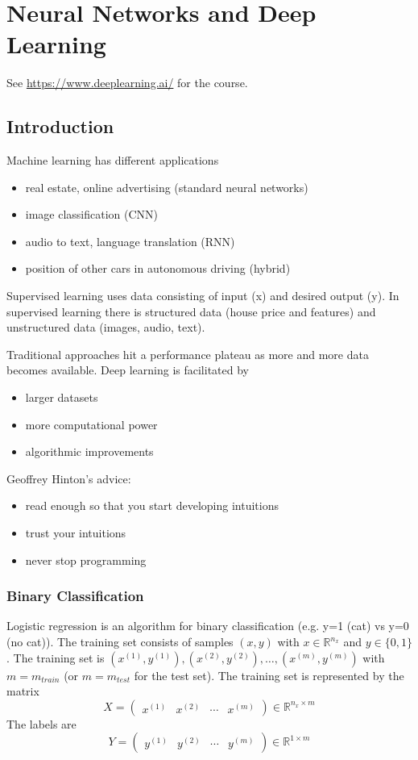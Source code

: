 \documentclass{article}
\begin{document}
\section{Neural Networks and Deep Learning}
See \url{https://www.deeplearning.ai/} for the course.
\subsection{Introduction}
Machine learning has different applications
\begin{itemize}
\item real estate, online advertising (standard neural networks)
\item image classification (CNN)
\item audio to text, language translation (RNN)
\item position of other cars in autonomous driving (hybrid)
\end{itemize}

Supervised learning uses data consisting of input (x) and desired output (y).
In supervised learning there is structured data (house price and features)
and unstructured data (images, audio, text).

Traditional approaches hit a performance plateau as more and more data becomes available.
Deep learning is facilitated by
\begin{itemize}
\item larger datasets
\item more computational power
\item algorithmic improvements
\end{itemize}

Geoffrey Hinton's advice:
\begin{itemize}
\item read enough so that you start developing intuitions
\item trust your intuitions
\item never stop programming
\end{itemize}

\subsubsection{Binary Classification}
Logistic regression is an algorithm for binary classification (e.g. y=1 (cat) vs y=0 (no cat)).
The training set consists of samples $(x,y)$ with $x\in\mathbb{R}^{n_x}$ and $y\in\{0,1\}$.
The training set is $(x^{(1)},y^{(1)}), (x^{(2)},y^{(2)}), \ldots, (x^{(m)},y^{(m)})$ with $m=m_{train}$ (or $m=m_{test}$ for the test set).
The training set is represented by the matrix
\begin{equation}
  X=\begin{pmatrix}x^{(1)} & x^{(2)} & \cdots & x^{(m)}\end{pmatrix}\in\mathbb{R}^{n_x\times m}
\end{equation}
The labels are
\begin{equation}
  Y=\begin{pmatrix}y^{(1)} & y^{(2)} & \cdots & y^{(m)}\end{pmatrix}\in\mathbb{R}^{1\times m}
\end{equation}
\end{document}
